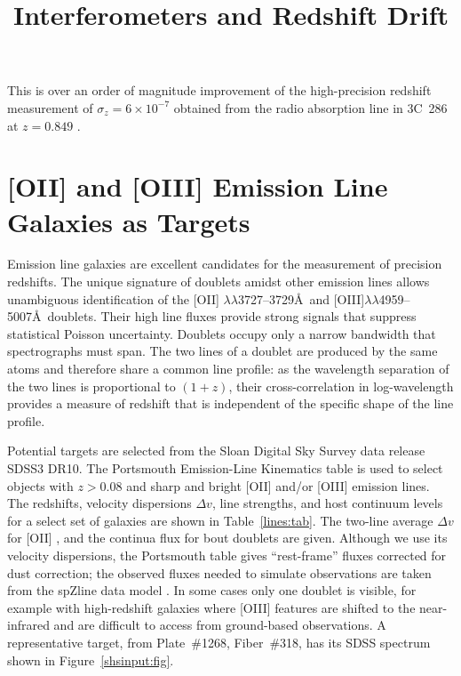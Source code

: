 \documentclass[preprint]{aastex}
\begin{document}
\title{Interferometers and Redshift Drift}
This is over an order of magnitude improvement
of the high-precision redshift measurement of  $\sigma_z=6\times 10^{-7}$ obtained
from the radio absorption line in 3C~286 at $z=0.849$
\citep{1978ApJ...219....1D}.

\section{[OII] and [OIII] Emission Line Galaxies as Targets}
Emission line galaxies are excellent candidates for the measurement of precision redshifts.
The unique signature
of doublets amidst  other emission lines allows unambiguous identification of the [OII] $\lambda\lambda$3727--3729\AA\ 
and [OIII]$\lambda\lambda$4959--5007\AA\ doublets.
Their high line fluxes provide strong signals that suppress statistical Poisson uncertainty.
Doublets occupy only a narrow bandwidth that spectrographs must span.
The two lines of a doublet are produced by the same atoms and therefore
share a common line profile: as the wavelength separation of the two lines is proportional to $(1+z)$, their cross-correlation in log-wavelength
provides a measure of redshift that is independent of the specific shape of the line profile.

Potential targets are selected from the Sloan Digital Sky Survey data release SDSS3 DR10.  The  Portsmouth Emission-Line Kinematics table \citep{2013MNRAS.431.1383T}  is used to select
objects 
with $z>0.08$
and sharp and bright [OII] and/or [OIII] emission lines.
The redshifts, velocity dispersions $\Delta v$, line strengths, and host continuum levels for a select set of galaxies are shown in Table~\ref{lines:tab}.
The two-line average $\Delta v$ for [OII] , and the continua flux for bout doublets  are given.
Although we use its velocity dispersions, the Portsmouth table  gives ``rest-frame'' fluxes corrected for dust correction;
the observed fluxes needed to simulate observations are taken from the spZline data model
\citep{2012AJ....144..144B}.  In some cases only one doublet is visible, for example with high-redshift galaxies where [OIII] features are shifted to the near-infrared and are difficult to access from ground-based observations.
A representative 
target, from Plate~\#1268, Fiber~\#318, has its  SDSS spectrum shown in Figure~\ref{shsinput:fig}.
\end{document}
